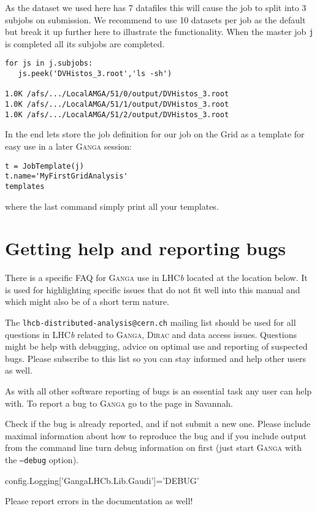 \documentclass{howto}
\def\ganga {\textsc{Ganga}\xspace}
\def\lhcb {LHC{\em b\/}\xspace}
\def\dirac {\textsc{Dirac}\xspace}
\begin{document}
As the dataset we used here has 7 datafiles this will cause the job to split
into 3 subjobs on submission. We recommend to use 10 datasets per job as the
default but break it up further here to illustrate the functionality. When the
master job \texttt{j} is completed all its subjobs are completed.
\begin{verbatim}
for js in j.subjobs:
   js.peek('DVHistos_3.root','ls -sh')

1.0K /afs/.../LocalAMGA/51/0/output/DVHistos_3.root
1.0K /afs/.../LocalAMGA/51/1/output/DVHistos_3.root
1.0K /afs/.../LocalAMGA/51/2/output/DVHistos_3.root
\end{verbatim}

In the end lets store the job definition for our job on the Grid as a template
for easy use in a later \ganga session:
\begin{verbatim}
t = JobTemplate(j)
t.name='MyFirstGridAnalysis'
templates
\end{verbatim}
where the last command simply print all your templates.

\section{Getting help and reporting bugs}
There is a specific FAQ for \ganga use in \lhcb located at the location
below. It is used for highlighting specific issues that do not fit well into
this manual and which might also be of a short term nature.
\begin{seealso}
\end{seealso}

The \texttt{lhcb-distributed-analysis@cern.ch} mailing list should be used for
all questions in \lhcb related to \ganga, \dirac and data access issues.
Questions might be help with debugging, advice on optimal use and reporting of
suspected bugs. Please subscribe to this list so you can stay informed and
help other users as well.

As with all other software reporting of bugs is an essential task any user can
help with. To report a bug to \ganga go to the page in Savannah.
\begin{seealso}
\end{seealso}
Check if the bug is already reported, and if not submit a new one. Please
include maximal information about how to reproduce the bug and if you include
output from the command line turn debug information on first (just start
\ganga with the \texttt{--debug} option).

config.Logging['GangaLHCb.Lib.Gaudi']='DEBUG'

Please report errors in the documentation as well!
\end{document}
